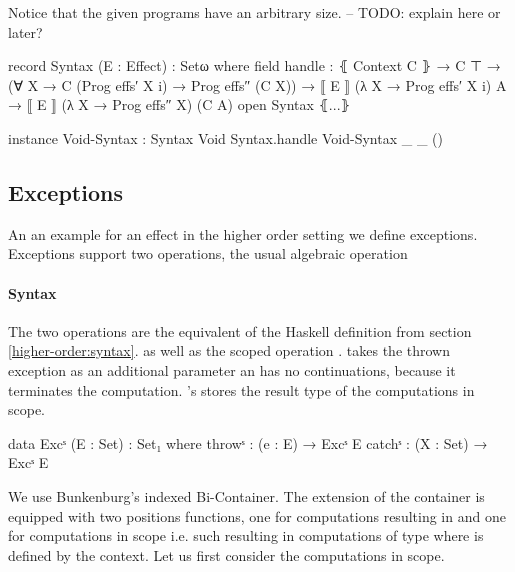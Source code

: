 Notice that the given programs have an arbitrary size. -- TODO: explain here or later?

\begin{code}
record Syntax (E : Effect) : Setω where
  field handle : ⦃ Context C ⦄ → C ⊤ →
          (∀ {X} → C (Prog effs′ X {i}) → Prog effs″ (C X)) →
          ⟦ E ⟧ (λ X → Prog effs′ X {i}) A → ⟦ E ⟧ (λ X → Prog effs″ X) (C A)
open Syntax ⦃...⦄
\end{code}

\begin{code}
instance
  Void-Syntax : Syntax Void
  Syntax.handle Void-Syntax _ _ ()
\end{code}

\subsection{Exceptions}

An an example for an effect in the higher order setting we define exceptions.
Exceptions support two operations, the usual algebraic operation

\paragraph{Syntax}
The two operations are the equivalent of the Haskell definition from section
\ref{higher-order:syntax}.
 as well as the scoped operation .
 takes the thrown exception as an additional parameter an
has no continuations, because it terminates the computation.
's  stores the result type of the
computations in scope.

\begin{code}
data Excˢ (E : Set) : Set₁ where
  throwˢ  : (e : E) → Excˢ E
  catchˢ  : (X : Set) → Excˢ E
\end{code}
We use Bunkenburg's indexed Bi-Container.
The extension of the container is equipped with two positions functions, one for
computations resulting in
\AgdaSpace{}\AgdaSpace{}
and one for computations in scope i.e. such resulting in computations of type
\AgdaSpace{}\AgdaSpace{}
where  is defined by the context.
Let us first consider the computations in scope.

